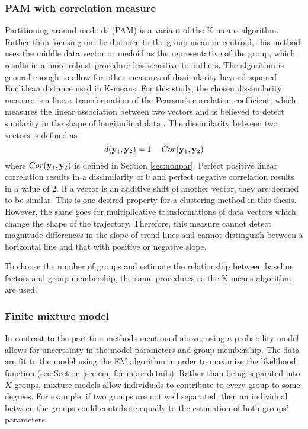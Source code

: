 \subsubsection{PAM with correlation measure}
Partitioning around medoids (PAM) is a variant of the K-means algorithm. Rather than focusing on the distance to the  group mean or centroid, this method uses the middle data vector or medoid as the representative of the group, which results in a more robust procedure less sensitive to outliers. The algorithm is general enough to allow for other measures of dissimilarity beyond squared Euclidean distance used in K-means. For this study, the chosen dissimilarity measure is a linear transformation of the Pearson's correlation coefficient, which measures the linear association between two vectors and is believed to detect similarity in the shape of longitudinal data \cite{chouakria2007,  eisen1998,chiou2008}. The dissimilarity between two vectors is defined as
$$d(\mathbf y_{1},\mathbf y_{2}) = 1-Cor(\mathbf y_{1},\mathbf y_{2})$$
where $Cor(\mathbf y_{1},\mathbf y_{2})$ is defined in Section \ref{sec:nonpar}. Perfect positive linear correlation results in a dissimilarity of 0 and perfect negative correlation results in a value of 2. If a vector is an additive shift of another vector, they are deemed to be similar. This is one desired property for a clustering method in this thesis. However, the same goes for multiplicative transformations of data vectors which change the shape of the trajectory. Therefore, this measure cannot detect magnitude differences in the slope of trend lines and cannot distinguish between a horizontal line and that with positive or negative slope.

To choose the number of groups and estimate the relationship between baseline factors and group membership, the same procedures as the K-means algorithm are used.

\subsubsection{Finite mixture model}
In contrast to the partition methods mentioned above, using a probability model allows for uncertainty in the model parameters and group membership. The data are fit to the model using the EM algorithm in order to maximize the likelihood function (see Section \ref{sec:em} for more details). Rather than being separated into $K$ groups, mixture models allow individuals to contribute to every group to some degrees. For example, if two groups are not well separated, then an individual between the groups could contribute equally to the estimation of both groups' parameters. 

